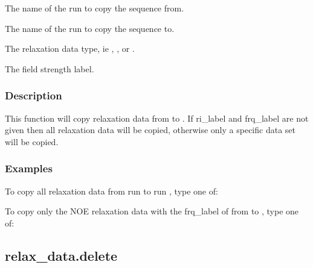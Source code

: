   The name of the run to copy the sequence from. 

  The name of the run to copy the sequence to. 

  The relaxation data type, ie , , or . 

  The field strength label. 




\subsubsection{Description}

This function will copy relaxation data from  to .  If ri\_label and frq\_label are not given then all relaxation data will be copied, otherwise only a specific data set will be copied.



\subsubsection{Examples}

To copy all relaxation data from run  to run , type one of:






To copy only the NOE relaxation data with the frq\_label of  from  to , type one of:






\newpage

\subsection{relax\_data.delete}


